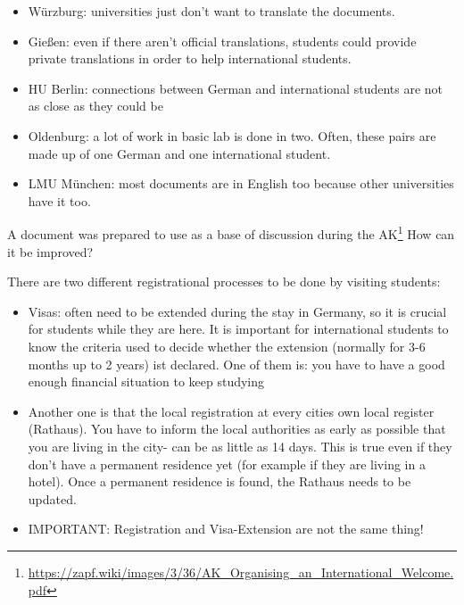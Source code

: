 \begin{itemize}
      \item Würzburg: universities just don't want to translate the documents.
      \item Gießen: even if there aren't official translations, students could provide private translations in order to help international students.
      \item HU Berlin: connections between German and international students are not as close as they could be
      \item Oldenburg: a lot of work in basic lab is done in two. Often, these pairs are made up of one German and one international student.
      \item LMU München: most documents are in English too because other universities have it too.
    \end{itemize}

    A document was prepared to use as a base of discussion during the AK\footnote{\url{https://zapf.wiki/images/3/36/AK_Organising_an_International_Welcome.pdf}}
    How can it be improved?

    There are two different registrational processes to be done by visiting students:
    \begin{itemize}
      \item Visas: often need to be extended during the stay in Germany, so it is crucial for students while they are here. It is important for international students to know the criteria used to decide whether the extension (normally for 3-6 months up to 2 years) ist declared. One of them is: you have to have a good enough financial situation to keep studying
      \item Another one is that the local registration at every cities own local register (Rathaus). You have to inform the local authorities as early as possible that you are living in the city- can be as little as 14 days. This is true even if they don't have a permanent residence yet (for example if they are living in a hotel). Once a permanent residence is found, the Rathaus needs to be updated.
      \item IMPORTANT: Registration and Visa-Extension are not the same thing!
    \end{itemize}

